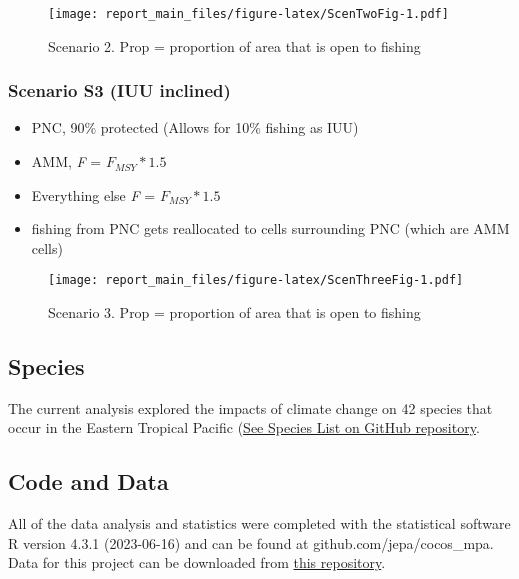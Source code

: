 \documentclass[
]{article}
\providecommand{\tightlist}{%
  \setlength{\itemsep}{0pt}\setlength{\parskip}{0pt}}
\begin{document}
\begin{figure}
\centering
\texttt{[image: report\_main\_files/figure-latex/ScenTwoFig-1.pdf]}
\caption{\label{fig:ScenTwoFig}Scenario 2. Prop = proportion of area that is open to fishing}
\end{figure}

\hypertarget{scenario-s3-iuu-inclined}{%
\subsubsection{Scenario S3 (IUU inclined)}\label{scenario-s3-iuu-inclined}}

\begin{itemize}
\tightlist
\item
  PNC, 90\% protected (Allows for 10\% fishing as IUU)
\item
  AMM, \emph{F} = \(F_{MSY}*1.5\)
\item
  Everything else \emph{F} = \(F_{MSY}*1.5\)
\item
  fishing from PNC gets reallocated to cells surrounding PNC (which are AMM cells)
\end{itemize}

\begin{figure}
\centering
\texttt{[image: report\_main\_files/figure-latex/ScenThreeFig-1.pdf]}
\caption{\label{fig:ScenThreeFig}Scenario 3. Prop = proportion of area that is open to fishing}
\end{figure}

\hypertarget{species}{%
\subsection{Species}\label{species}}

The current analysis explored the impacts of climate change on 42 species that occur in the Eastern Tropical Pacific (\href{https://github.com/jepa/cocos_mpa/blob/main/data/species/project_species_list.csv}{See Species List on GitHub repository}.

\hypertarget{code-and-data}{%
\subsection{Code and Data}\label{code-and-data}}

All of the data analysis and statistics were completed with the statistical software R version 4.3.1 (2023-06-16) and can be found at github.com/jepa/cocos\_mpa. Data for this project can be downloaded from \href{link\%20to\%20data}{this repository}.
\end{document}
